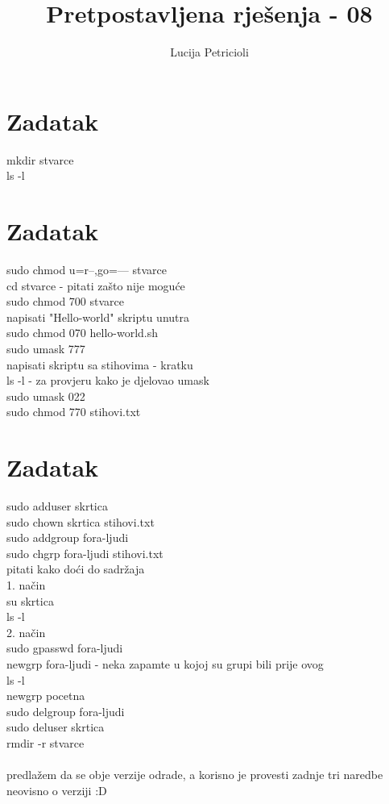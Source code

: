 \documentclass[12pt,a4paper]{article}
\begin{document}
	\title{Pretpostavljena rješenja - 08}
	\maketitle
	\author{Lucija Petricioli}
	\section{Zadatak}
	mkdir stvarce \\
	ls -l \\
	
	\section{Zadatak}
	sudo chmod u=r--,go=--- stvarce \\
	cd stvarce - pitati zašto nije moguće \\
	sudo chmod 700 stvarce \\
	napisati "Hello-world" skriptu unutra \\
	sudo chmod 070 hello-world.sh \\
	sudo umask 777 \\
	napisati skriptu sa stihovima - kratku \\
	ls -l - za provjeru kako je djelovao umask \\
	sudo umask 022 \\
	sudo chmod 770 stihovi.txt \\
	
	\section{Zadatak}
	sudo adduser skrtica \\
	sudo chown skrtica stihovi.txt \\
	sudo addgroup fora-ljudi \\
	sudo chgrp fora-ljudi stihovi.txt \\
	pitati kako doći do sadržaja \\
	1. način \\
	su skrtica \\
	ls -l \\
	2. način \\
	sudo gpasswd fora-ljudi\\
	newgrp fora-ljudi - neka zapamte u kojoj su grupi bili prije ovog\\
	ls -l \\
	newgrp pocetna \\
	sudo delgroup fora-ljudi \\
	sudo deluser skrtica \\
	rmdir -r stvarce \\
	\\
	predlažem da se obje verzije odrade, a korisno je provesti zadnje tri naredbe neovisno o verziji :D\\
	
\end{document}
